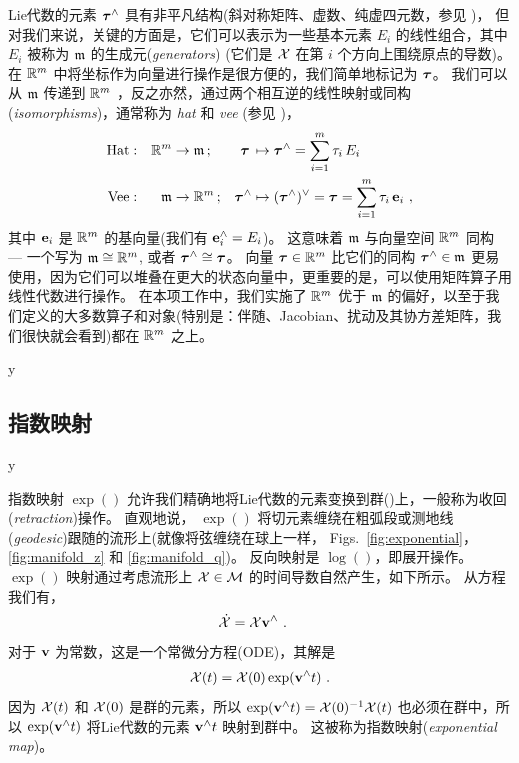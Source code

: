 %
Lie代数的元素 ${\bm \tau}^\wedge$ 具有非平凡结构(斜对称矩阵、虚数、纯虚四元数，参见 )，
但对我们来说，关键的方面是，它们可以表示为一些基本元素 $E_i$ 的线性组合，其中 $E_i$ 被称为 $\frak{m}$ 的生成元(\emph{generators}) 
(它们是 $\mathcal{X}$ 在第 $i$ 个方向上围绕原点的导数)。
在 ${\mathbb R}^m$ 中将坐标作为向量进行操作是很方便的，我们简单地标记为 ${\bm \tau}$。
我们可以从 $\frak{m}$ 传递到 ${\mathbb R}^m$ ，反之亦然，通过两个相互逆的线性映射或同构(\emph{isomorphisms})，通常称为 \emph{hat} 和 \emph{vee} (参见 )，
%
\begin{align} 
\textrm{Hat}&:& 
{\mathbb R}^m&\to\frak{m}\,; 
  & 
  {\bm \tau}\,
  &\mapsto {\bm \tau}^\wedge 
  = \sum_{i=1}^m \tau_i\, E_i \label{equ:hat} 
\\
\textrm{Vee}&:& 
  \frak{m}&\to{\mathbb R}^m\,; 
  & {\bm \tau}^\wedge
  & \mapsto ({\bm \tau}^\wedge)^\vee
  ={\bm \tau}
  = \sum_{i=1}^m \tau_i\,{\bf e}_i   \label{equ:vee}
~,
\end{align}
%
其中 ${\bf e}_i$ 是 ${\mathbb R}^m$ 的基向量(我们有 ${\bf e}_i^\wedge=E_i$)。
这意味着 $\frak{m}$ 与向量空间 ${\mathbb R}^m$ 同构 
--- 一个写为 $\frak{m}\cong{\mathbb R}^m$, 或者 ${\bm \tau}^\wedge\cong{\bm \tau}$。
向量 ${\bm \tau}\in{\mathbb R}^m$ 比它们的同构 ${\bm \tau}^\wedge\in\frak{m}$ 更易使用，因为它们可以堆叠在更大的状态向量中，更重要的是，可以使用矩阵算子用线性代数进行操作。
在本项工作中，我们实施了 ${\mathbb R}^m$ 优于 $\frak{m}$ 的偏好，以至于我们定义的大多数算子和对象(特别是：伴随、Jacobian、扰动及其协方差矩阵，我们很快就会看到)都在 ${\mathbb R}^m$ 之上。



\if\examples y

\fi



\subsection{指数映射}


\if\examples y

\fi

指数映射 $\exp()$ 允许我们精确地将Lie代数的元素变换到群()上，一般称为收回(\emph{retraction})操作。
直观地说， $\exp()$ 将切元素缠绕在粗弧段或测地线(\emph{geodesic})跟随的流形上(就像将弦缠绕在球上一样， Figs.~\ref{fig:exponential}， \ref{fig:manifold_z} 和 \ref{fig:manifold_q})。
反向映射是 $\log()$，即展开操作。
 $\exp()$ 映射通过考虑流形上 $\mathcal{X}\in\mathcal{M}$ 的时间导数自然产生，如下所示。
%
从方程  我们有，
%
\begin{align}\label{equ:ode}
\dot{\mathcal{X}} &= \mathcal{X}{\bf v}^\wedge 
~.
\end{align}
%
对于 ${\bf v}$ 为常数，这是一个常微分方程(ODE)，其解是 
%
\begin{align}\label{equ:exp_at_X}
\mathcal{X}(t)   = \mathcal{X}(0)\exp({\bf v}^\wedge t)
~.
\end{align}
%
因为 $\mathcal{X}(t)$ 和 $\mathcal{X}(0)$ 是群的元素，所以 $\exp({\bf v}^\wedge t)=\mathcal{X}(0)^{-1}\mathcal{X}(t)$ 也必须在群中，所以 $\exp({\bf v}^\wedge t)$ 将Lie代数的元素 ${\bf v}^\wedge t$ 映射到群中。
这被称为指数映射(\emph{exponential map})。

